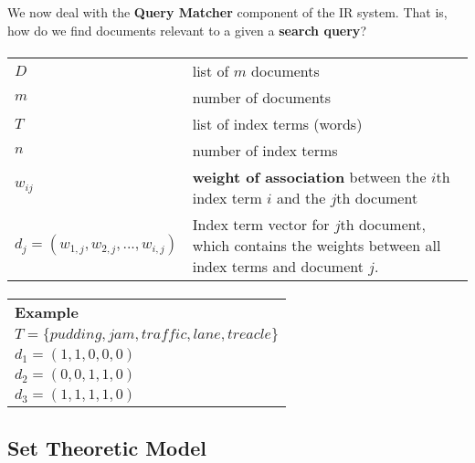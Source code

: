 \documentclass{article}
\begin{document}
We now deal with the \textbf{Query Matcher} component of the IR system. That is, how do we find documents relevant to a given a \textbf{search query}?

\paragraph{}

\begin{tabular}{p{4cm}p{12cm}}
	$D$ & list of $m$ documents \\
	$m$ & number of documents \\
	$T$ & list of index terms (words) \\
	$n$ & number of index terms \\
	$w_{ij}$ & \textbf{weight of association} between the $i$th index term $i$ and the $j$th document \\
	$d_j = (w_{1,j}, w_{2,j}, ..., w_{i,j})$ & Index term vector for $j$th document, which contains the weights between all index terms and document $j$.
\end{tabular}

\paragraph{}

\begin{tabular}{p{16cm}}
	\textbf{Example} \\
	$T = \lbrace pudding, jam, traffic, lane, treacle \rbrace$ \\
	$d_1 = (1, 1, 0, 0, 0)$ \\
	$d_2 = (0, 0, 1, 1, 0)$ \\
	$d_3 = (1, 1, 1, 1, 0)$ \\
\end{tabular}

\subsection{Set Theoretic Model}
\end{document}
